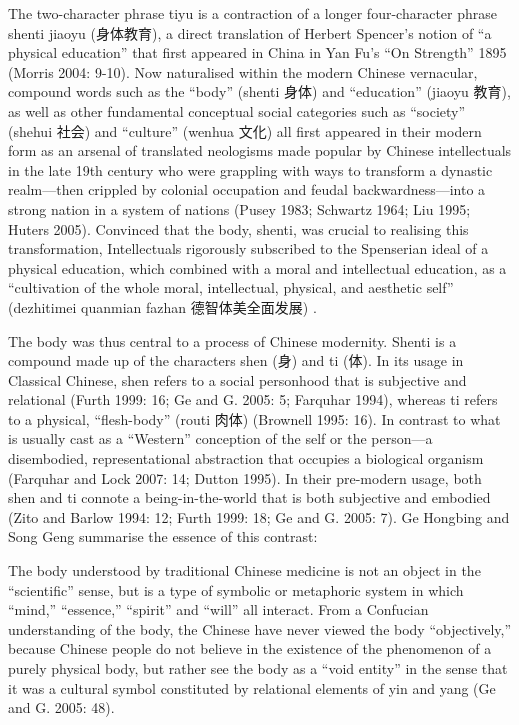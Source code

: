 The two-character phrase tiyu is a contraction of a longer four-character phrase shenti jiaoyu (身体教育), a direct translation of Herbert Spencer’s notion of  ``a physical education'' that first appeared in China in Yan Fu’s ``On Strength'' 1895 (Morris 2004: 9-10).   Now naturalised within the modern Chinese vernacular, compound words such as the ``body'' (shenti 身体) and ``education'' (jiaoyu 教育), as well as other fundamental conceptual social categories such as ``society'' (shehui 社会) and ``culture'' (wenhua 文化) all first appeared in their modern form as an arsenal of translated neologisms made popular by Chinese intellectuals in the late 19th century who were grappling with ways to transform a dynastic realm—then crippled by colonial occupation and feudal backwardness—into a strong nation in a system of nations (Pusey 1983; Schwartz 1964; Liu 1995; Huters 2005).   Convinced that the body, shenti, was crucial to realising this transformation, Intellectuals rigorously subscribed to the Spenserian ideal of a physical education, which combined with a moral and intellectual education, as a ``cultivation of the whole moral, intellectual, physical, and aesthetic self'' (dezhitimei quanmian fazhan 德智体美全面发展) \citep[][10]{Morris2004}.

The body was thus central to a process of Chinese modernity.  Shenti is a compound made up of the characters shen (身) and ti (体).  In its usage in Classical Chinese, shen refers to a social personhood that is subjective and relational (Furth 1999: 16; Ge and G. 2005: 5; Farquhar 1994), whereas ti refers to a physical, ``flesh-body'' (routi 肉体) (Brownell 1995: 16).  In contrast to what is usually cast as a  ``Western'' conception of the self or the person—a disembodied, representational abstraction that occupies a biological organism (Farquhar and Lock 2007: 14; Dutton 1995). In their pre-modern usage, both shen and ti connote a being-in-the-world that is both subjective and embodied (Zito and Barlow 1994: 12; Furth 1999: 18; Ge and G. 2005: 7). Ge Hongbing and Song Geng summarise the essence of this contrast:

    The body understood by traditional Chinese medicine is not an object in the ``scientific'' sense, but is a type of symbolic or metaphoric system in which ``mind,'' ``essence,'' ``spirit'' and ``will'' all interact.  From a Confucian understanding of the body, the Chinese have never viewed the body ``objectively,'' because Chinese people do not believe in the existence of the phenomenon of a purely physical body, but rather see the body as a ``void entity'' in the sense that it was a cultural symbol constituted by relational elements of yin and yang (Ge and G. 2005: 48).

